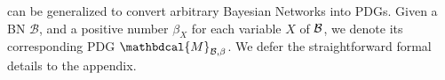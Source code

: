 \documentclass[letterpaper]{article} %
\theoremstyle{plain}
\theoremstyle{definition}
\theoremstyle{remark}
\newcommand{\dg}[1]{\mathbdcal{#1}}
\newcommand{\PDGof}[1]{{\dg M}_{#1}}
\begin{document}
 can be generalized to convert arbitrary Bayesian Networks into PDGs.
Given a BN $\mathcal B$, and a positive number $\beta_X$ for
        each variable $X$ of $\cal B$,
we denote its corresponding PDG $\PDGof{\mathcal B, \beta}$.  We defer the
straightforward formal details
to the appendix. %
\end{document}
